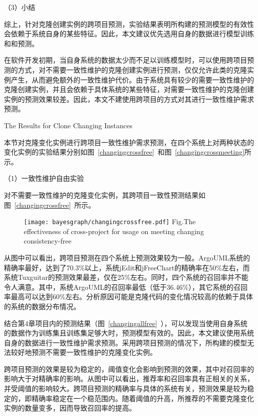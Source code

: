 （3）小结

综上，针对克隆创建实例的跨项目预测，实验结果表明所构建的预测模型的有效性会依赖于系统自身的某些特征。因此，本文建议优先选用自身的数据进行模型训练和和预测。

在软件开发初期，当自身系统的数据太少而不足以训练模型时，可以使用跨项目预测的方式，对不需要一致性维护的克隆创建实例进行预测，仅仅允许此类的克隆实例产生，从而避免额外的一致性维护代价。由于系统具有较少的需要一致性维护的克隆创建实例，并且会依赖于具体系统的某些特征，对需要一致性维护的克隆创建实例的预测效果较差。因此，本文不建使用跨项目的方式对其进行一致性维护需求预测。

{The Results for Clone Changing Instances}

本节对克隆变化实例进行跨项目一致性维护需求预测，在四个系统上对两种状态的变化实例的实验结果分别如图~\ref{changingcrossfree}~和图~\ref{changingcrossmeeting}所示。

（1）一致性维护自由实验

对不需要一致性维护的克隆变化实例，其跨项目一致性预测结果如图~\ref{changingcrossfree}~所示。

\begin{figure}[h]
\centering
\texttt{[image: bayesgraph/changingcrossfree.pdf]}
{Fig.$\!$}{The effectiveness of cross-project for usage on meeting changing consistency-free}
\vspace{-1em}
\end{figure}

从图中可以看出，跨项目预测在四个系统上预测效果较为一般。ArgoUML系统的精确率最好，达到了70.3\%以上，系统jEdit和jFreeChart的精确率在50\%左右，而系统Tuxguitar的预测效果最差，仅在25\%左右。同时，四个系统的召回率并不能令人满意。其中，系统ArgoUML的召回率最低（低于36.46\%），其它系统的召回率最高可以达到60\%左右。分析原因可能是克隆代码的变化情况较高的依赖于具体的系统的数据分布情况。

结合第4章项目内的预测结果（图~\ref{changingallfree}~），可以发现当使用自身系统的数据作为训练集且训练集足够大时，预测模型有效的。因此，本文建议使用系统自身的数据进行一致性维护需求预测。采用跨项目预测的情况下，所构建的模型无法较好地预测不需要一致性维护的克隆变化实例。

跨项目预测的效果是较为稳定的，阈值变化会影响到预测的效果，其中对召回率的影响大于对精确率的影响。从图中可以看出，推荐率和召回率具有正相关的关系，并受阈值的影响较大。跨项目预测的精确率与具体的系统有关，预测效果是较为稳定的，即精确率稳定在一个稳范围内。随着阈值的升高，所推荐的不需要克隆变化实例的数量变多，因而导致召回率的提高。

